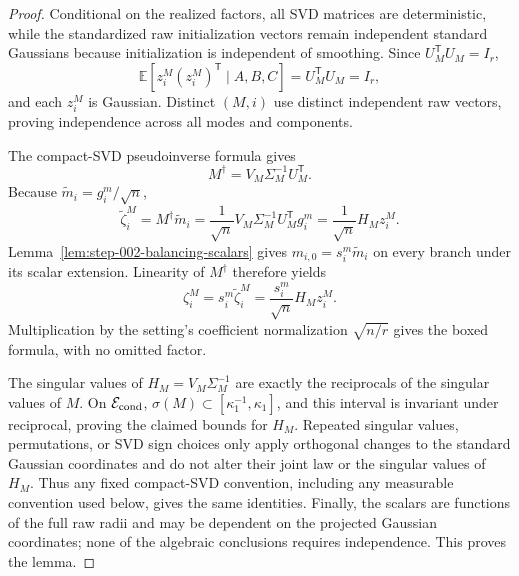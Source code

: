 \begin{proof}
Conditional on the realized factors, all SVD
matrices are deterministic, while the standardized raw initialization vectors
remain independent standard Gaussians because initialization is independent
of smoothing. Since \(U_M^{\mathsf T}U_M=I_r\),
\[
  \mathbb E[z_i^M(z_i^M)^{\mathsf T}\mid A,B,C]
  =U_M^{\mathsf T}U_M=I_r,
\]
and each \(z_i^M\) is Gaussian. Distinct \((M,i)\) use distinct independent
raw vectors, proving independence across all modes and components.

The compact-SVD pseudoinverse formula gives
\[
  M^\dagger=V_M\Sigma_M^{-1}U_M^{\mathsf T}.
\]
Because \(\widetilde m_i=g_i^m/\sqrt n\),
\begin{equation}
  \widetilde\zeta_i^M
  =M^\dagger\widetilde m_i
  =\frac1{\sqrt n}V_M\Sigma_M^{-1}U_M^{\mathsf T}g_i^m
  =\frac1{\sqrt n}H_Mz_i^M.                 \label{eq:step-002-1}
\end{equation}
Lemma~\ref{lem:step-002-balancing-scalars} gives
\(m_{i,0}=s_i^m\widetilde m_i\) on every branch under its scalar extension.
Linearity of \(M^\dagger\) therefore yields
\begin{equation}
  \zeta_i^M=s_i^m\widetilde\zeta_i^M
  =\frac{s_i^m}{\sqrt n}H_Mz_i^M.           \label{eq:step-002-2}
\end{equation}
Multiplication by the setting's coefficient normalization
\(\sqrt{n/r}\) gives the boxed formula, with no omitted factor.

The singular values of \(H_M=V_M\Sigma_M^{-1}\) are exactly the reciprocals
of the singular values of \(M\). On \(\mathcal E_{\rm cond}\),
\(\sigma(M)\subset[\kappa_1^{-1},\kappa_1]\), and this interval is invariant
under reciprocal, proving the claimed bounds for \(H_M\). Repeated singular
values, permutations, or SVD sign choices only apply orthogonal changes to
the standard Gaussian coordinates and do not alter their joint law or the
singular values of \(H_M\). Thus any fixed compact-SVD convention, including
any measurable convention used below, gives the same identities. Finally, the
scalars are functions of the full raw radii and may be dependent on the
projected Gaussian coordinates; none of the algebraic conclusions requires
independence. This proves the lemma.

\end{proof}


